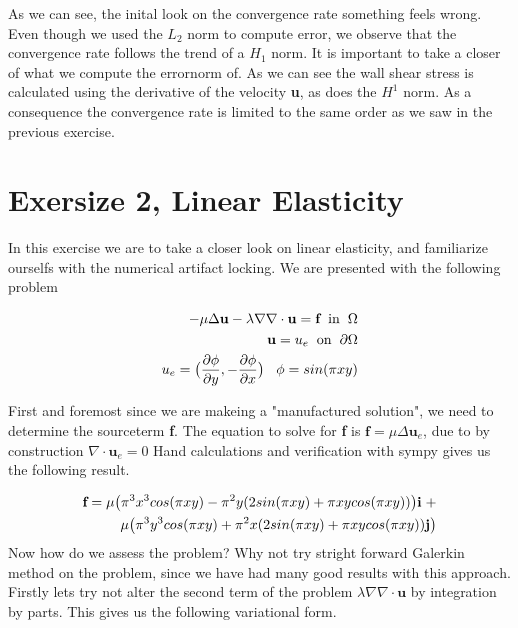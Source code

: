 \documentclass[a4paper,norsk]{article}
\begin{document}
As we can see, the inital look on the convergence rate something feels wrong. Even though we used the $L_2$ norm
to compute error, we observe that the convergence rate follows the trend of a $H_1$ norm. It is important to take a closer of what
we compute the errornorm of. As we can see the wall shear stress is calculated using the derivative of the velocity \textbf{u}, as does the $H^1$ norm. As a consequence the convergence rate is limited to the same order as we saw in the previous exercise.


\section*{Exersize 2, Linear Elasticity}
In this exercise we are to take a closer look on linear elasticity, and familiarize ourselfs with
the numerical artifact locking. We are presented with the following problem

\begin{align*}
-\mu \Delta \textbf{u} - \lambda \nabla \nabla \cdot \textbf{u} = \textbf{f} \hspace{2mm} \text{in} \hspace{2mm} \Omega \\
\textbf{u} = u_e \hspace{2mm} \text{on} \hspace{2mm} \partial \Omega \\
u_e = \big(\frac{\partial \phi}{\partial y}, -\frac{\partial \phi}{\partial x} \big) \hspace{3mm}
\phi = sin(\pi x y)
\end{align*}

First and foremost since we are makeing a "manufactured solution", we need to determine the sourceterm \textbf{f}. The equation
to solve for \textbf{f} is $\textbf{f} =\mu  \Delta \textbf{u}_e$, due to by construction $\nabla \cdot \textbf{u}_e = 0$
 Hand calculations and verification with sympy gives us the following result.

\begin{align*}
\textbf{f} = \mu \big(\pi^3 x^3 cos(\pi x y) -\pi^2y (2sin(\pi x y) + \pi x y cos(\pi x y)   ) \big) \textbf{i} \hspace{1mm} + \\
\mu \big( \pi^3y^3 cos(\pi x y) + \pi^2 x (2 sin(\pi x y) + \pi x y cos(\pi x y)   ) \textbf{j} \big)
\end{align*}
Now how do we assess the problem?
Why not try stright forward Galerkin method on the problem, since we have had many good results with this approach.
Firstly lets try not alter the second term of the problem $\lambda \nabla \nabla \cdot \textbf{u}$ by integration by parts.
This gives us the following variational form.
\end{document}

